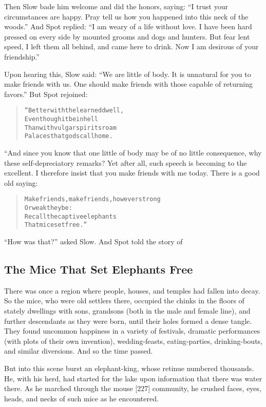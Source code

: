 \documentclass[article, twoside, 14pt]{memoir}
\renewenvironment{verbatim}{%
\begin{quote}%
\vskip -10pt%
\begin{alltt}\normalfont\large}{\end{alltt}%
\end{quote}%
\vskip -10pt
} %
\begin{document}
Then Slow bade him welcome and did the honors, saying:
``I trust your circumstances are happy. Pray tell us how you happened into this neck of the woods.''
And Spot replied:
``I am weary of a life without love. I have been hard pressed on every side by mounted grooms and dogs and hunters. But fear lent speed, I left them all behind, and came here to drink. Now I am desirous of your friendship.''

Upon hearing this, Slow said:
``We are little of body. It is unnatural for you to make friends with us. One should make friends with those capable of returning favors.''
But Spot rejoined:

\begin{verbatim}
“Better with the learned dwell,
Even though it be in hell
Than with vulgar spirits roam
Palaces that gods call home.
\end{verbatim}
“And since you know that one little of body may be of no little
consequence, why these self-depreciatory remarks? Yet after all,
such speech is becoming to the excellent. I therefore insist that
you make friends with me today. There is a good old saying:

\begin{verbatim}
Make friends, make friends, however strong
    Or weak they be:
Recall the captive elephants
    That mice set free.”
\end{verbatim}
``How was that?'' asked Slow. And Spot told the story of

\subsection{The Mice That Set Elephants Free}

\label{s44}

There was once a region where people, houses, and temples had
fallen into decay. So the mice, who were old settlers there,
occupied the chinks in the floors of stately dwellings with sons,
grandsons (both in the male and female line), and further
descendants as they were born, until their holes formed a dense
tangle. They found uncommon happiness in a variety of festivals,
dramatic performances (with plots of their own invention),
wedding-feasts, eating-parties, drinking-bouts, and similar
diversions. And so the time passed.

But into this scene burst an elephant-king, whose retinue numbered
thousands. He, with his herd, had started for the lake upon
information that there was water there. As he marched through the
mouse [227] community, he crushed faces, eyes, heads, and necks of
such mice as he encountered.
\end{document}
